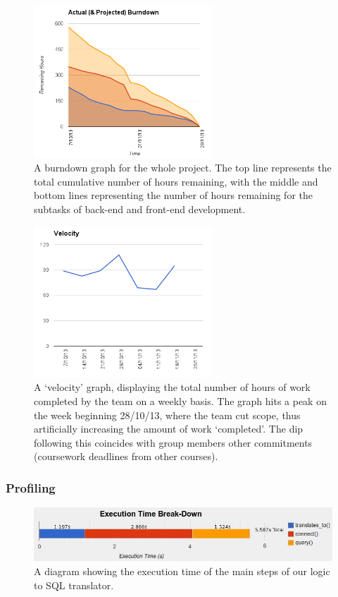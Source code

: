 \documentclass[a4paper, 11pt]{article}
\begin{document}
    \begin{figure}[H]
      \centering
      \includegraphics[width=0.6\textwidth]{images/chart1.png}
      \caption{A burndown graph for the whole project. The top line represents
        the total cumulative number of hours remaining, with the middle and
        bottom lines representing the number of hours remaining for the
      subtasks of back-end and front-end development.}
    \end{figure}

    \begin{figure}[H]
      \centering
      \includegraphics[width=0.6\textwidth]{images/velocity.png}
      \caption{A `velocity' graph, displaying the total number of hours of work
        completed by the team on a weekly basis. The graph hits a peak on the
        week beginning 28/10/13, where the team cut scope, thus artificially
        increasing the amount of work `completed'. The dip following this
        coincides with group members other commitments (coursework deadlines
        from other courses).}
      \end{figure}

  \subsubsection{Profiling}
     \begin{figure}[H]
        \includegraphics[width=1.0\textwidth]{images/1.jpg}
        \caption{A diagram showing the execution time of the main steps of our
        logic to SQL translator.}
      \end{figure} 
\end{document}
